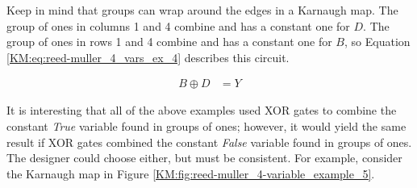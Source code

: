 \begin{figure}[H]
\end{figure}

Keep in mind that groups can wrap around the edges in a Karnaugh map. The group of ones in columns 1 and 4 combine and has a constant one for $ D $. The group of ones in rows 1 and 4 combine and has a constant one for $ B $, so Equation \ref{KM:eq:reed-muller_4_vars_ex_4} describes this circuit.

\begin{align}
  \label{KM:eq:reed-muller_4_vars_ex_4}
  B \oplus D &= Y 
\end{align}

It is interesting that all of the above examples used \textsf{XOR} gates to combine the constant \emph{True} variable found in groups of ones; however, it would yield the same result if \textsf{XOR} gates combined the constant \emph{False} variable found in groups of ones. The designer could choose either, but must be consistent. For example, consider the Karnaugh map in Figure \ref{KM:fig:reed-muller_4-variable_example_5}. 

